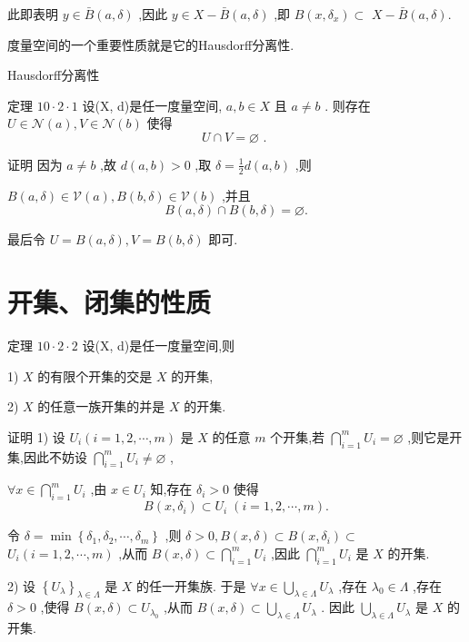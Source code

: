 此即表明 $y \in  \bar{B}\left( {a,\delta }\right)$ ,因此 $y \in  X - \bar{B}\left( {a,\delta }\right)$ ,即 $B\left( {x,{\delta }_{x}}\right)  \subset$  $X - \bar{B}\left( {a,\delta }\right) .$

度量空间的一个重要性质就是它的Hausdorff分离性.

Hausdorff分离性

定理 ${10} \cdot  2 \cdot  1$ 设(X, d)是任一度量空间, $a,b \in  X$ 且 $a \neq  b$ . 则存在 $U \in  \mathcal{N}\left( a\right) ,V \in  \mathcal{N}\left( b\right)$ 使得
$$U \cap  V = \varnothing \text{ . }$$

证明 因为 $a \neq  b$ ,故 $d\left( {a,b}\right)  > 0$ ,取 $\delta  = \frac{1}{2}d\left( {a,b}\right)$ ,则

$B\left( {a,\delta }\right)  \in  \mathcal{V}\left( a\right) ,B\left( {b,\delta }\right)  \in  \mathcal{V}\left( b\right)$ ,并且
$$B\left( {a,\delta }\right)  \cap  B\left( {b,\delta }\right)  = \varnothing .$$

最后令 $U = B\left( {a,\delta }\right) ,V = B\left( {b,\delta }\right)$ 即可.

\section*{开集、闭集的性质}

定理 ${10} \cdot  2 \cdot  2$ 设(X, d)是任一度量空间,则

1) $X$ 的有限个开集的交是 $X$ 的开集,

2) $X$ 的任意一族开集的并是 $X$ 的开集.

证明 1) 设 ${U}_{i}\left( {i = 1,2,\cdots ,m}\right)$ 是 $X$ 的任意 $m$ 个开集,若 $\mathop{\bigcap }\limits_{{i = 1}}^{m}{U}_{i} = \varnothing$ ,则它是开集,因此不妨设 $\mathop{\bigcap }\limits_{{i = 1}}^{m}{U}_{i} \neq  \varnothing$ ,

$\forall x \in  \mathop{\bigcap }\limits_{{i = 1}}^{m}{U}_{i}$ ,由 $x \in  {U}_{i}$ 知,存在 ${\delta }_{i} > 0$ 使得
$$B\left( {x,{\delta }_{i}}\right)  \subset  {U}_{i}\;\left( {i = 1,2,\cdots ,m}\right) .$$

令 $\delta  = \min \left\{  {{\delta }_{1},{\delta }_{2},\cdots ,{\delta }_{m}}\right\}$ ,则 $\delta  > 0,B\left( {x,\delta }\right)  \subset  B\left( {x,{\delta }_{i}}\right)  \subset$  ${U}_{i}\left( {i = 1,2,\cdots ,m}\right)$ ,从而 $B\left( {x,\delta }\right)  \subset  \mathop{\bigcap }\limits_{{i = 1}}^{m}{U}_{i}$ ,因此 $\mathop{\bigcap }\limits_{{i = 1}}^{m}{U}_{i}$ 是 $X$ 的开集.

2) 设 ${\left\{  {U}_{\lambda }\right\}  }_{\lambda  \in  \Lambda }$ 是 $X$ 的任一开集族. 于是 $\forall x \in  \mathop{\bigcup }\limits_{{\lambda  \in  \Lambda }}{U}_{\lambda }$ ,存在 ${\lambda }_{0} \in  \Lambda$ ,存在 $\delta  > 0$ ,使得 $B\left( {x,\delta }\right)  \subset  {U}_{{\lambda }_{0}}$ ,从而 $B\left( {x,\delta }\right)  \subset  \mathop{\bigcup }\limits_{{\lambda  \in  \Lambda }}{U}_{\lambda }$ . 因此 $\mathop{\bigcup }\limits_{{\lambda  \in  \Lambda }}{U}_{\lambda }$ 是 $X$ 的开集.

